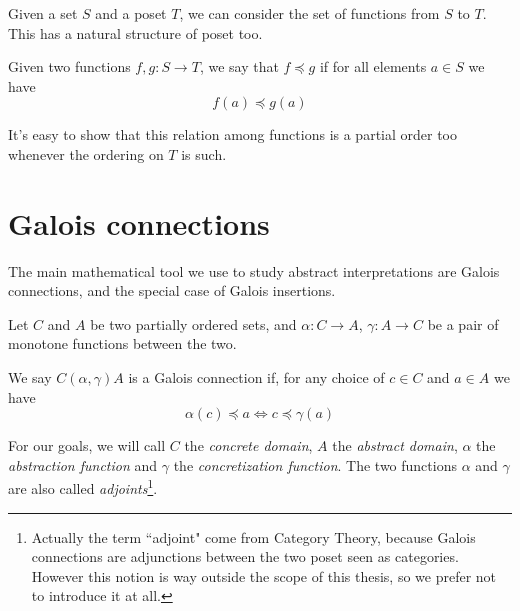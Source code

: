 \begin{definition}
\end{definition}

\begin{definition}
\end{definition}

\begin{definition}
\end{definition}

Given a set $S$ and a poset $T$, we can consider the set of functions from $S$ to $T$. This has a natural structure of poset too.
\begin{definition}
	Given two functions $f, g: S \rightarrow T$, we say that $f \preceq g$ if for all elements $a \in S$ we have
	\[
	f(a) \preceq g(a)
	\]
\end{definition}
It's easy to show that this relation among functions is a partial order too whenever the ordering on $T$ is such.

\section{Galois connections}
The main mathematical tool we use to study abstract interpretations are Galois connections, and the special case of Galois insertions.

\begin{definition}\label{ch2:def:gc}
	Let $C$ and $A$ be two partially ordered sets, and $\alpha : C \rightarrow A$, $\gamma : A \rightarrow C$ be a pair of monotone functions between the two.
	
	We say $C (\alpha, \gamma) A$ is a Galois connection if, for any choice of $c \in C$ and $a \in A$ we have
	\[
	\alpha(c) \preceq a \iff c \preceq \gamma(a)
	\]
\end{definition}

For our goals, we will call $C$ the \textit{concrete domain}, $A$ the \textit{abstract domain}, $\alpha$ the \textit{abstraction function} and $\gamma$ the \textit{concretization function}. The two functions $\alpha$ and $\gamma$ are also called \textit{adjoints}\footnote{Actually the term ``adjoint" come from Category Theory, because Galois connections are adjunctions between the two poset seen as categories. However this notion is way outside the scope of this thesis, so we prefer not to introduce it at all.}.

